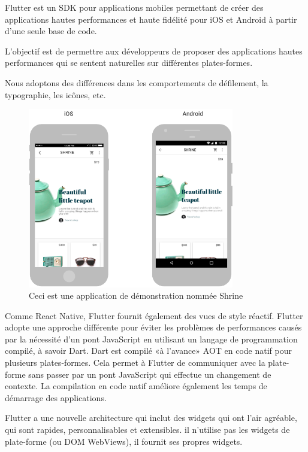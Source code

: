 Flutter est un SDK pour applications mobiles permettant de créer des applications hautes performances et haute fidélité pour iOS et Android à partir d'une seule base de code\cite{noauthor_technical_nodate}.\medskip

L'objectif est de permettre aux développeurs de proposer des applications hautes performances qui se sentent naturelles sur différentes plates-formes.

Nous adoptons des différences dans les comportements de défilement, la typographie, les icônes, etc.\bigskip

\begin{figure}[h]
	\begin{center}
		\includegraphics[width=9cm]{Images/chapter2/flutter_android_ios.png}
		\caption{{\footnotesize Ceci est une application de démonstration nommée Shrine\cite{noauthor_technical_nodate}}}
	\end{center}
\end{figure}

Comme React Native, Flutter fournit également des vues de style réactif. Flutter adopte une approche différente pour éviter les problèmes de performances causés par la nécessité d'un pont JavaScript en utilisant un langage de programmation compilé, à savoir Dart. Dart est compilé «à l'avance» \acrshort{AOT} en code natif pour plusieurs plates-formes. Cela permet à Flutter de communiquer avec la plate-forme sans passer par un pont JavaScript qui effectue un changement de contexte. La compilation en code natif améliore également les temps de démarrage des applications.\medskip

Flutter a une nouvelle architecture qui inclut des widgets qui ont l’air agréable, qui sont rapides, personnalisables et extensibles. il n'utilise pas les widgets de plate-forme (ou DOM WebViews), il fournit ses propres widgets.


